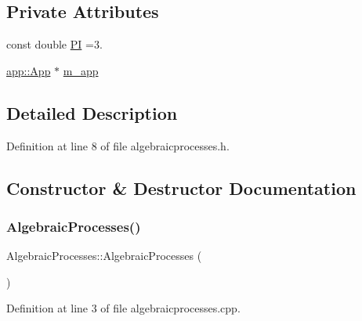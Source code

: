 \subsection*{Private Attributes}
\begin{DoxyCompactItemize}
\item 
const double \mbox{\hyperlink{class_algebraic_processes_abc06b36148d57f4ef59f24620f13a138}{PI}} =3.
\item 
\mbox{\hyperlink{classapp_1_1_app}{app\+::\+App}} $\ast$ \mbox{\hyperlink{class_algebraic_processes_a53265d1c47fc7c240295615f2e994980}{m\+\_\+app}}
\end{DoxyCompactItemize}


\subsection{Detailed Description}


Definition at line 8 of file algebraicprocesses.\+h.



\subsection{Constructor \& Destructor Documentation}
\mbox{\label{class_algebraic_processes_ac411dfd34f3bf9c42eb5f111e7f705d5}} 
\subsubsection{\texorpdfstring{Algebraic\+Processes()}{AlgebraicProcesses()}}
{\footnotesize\ttfamily Algebraic\+Processes\+::\+Algebraic\+Processes (\begin{DoxyParamCaption}{ }\end{DoxyParamCaption})}



Definition at line 3 of file algebraicprocesses.\+cpp.

\mbox{\label{class_algebraic_processes_a0599da6d65adc6ff61681190acf47d7e}} 
